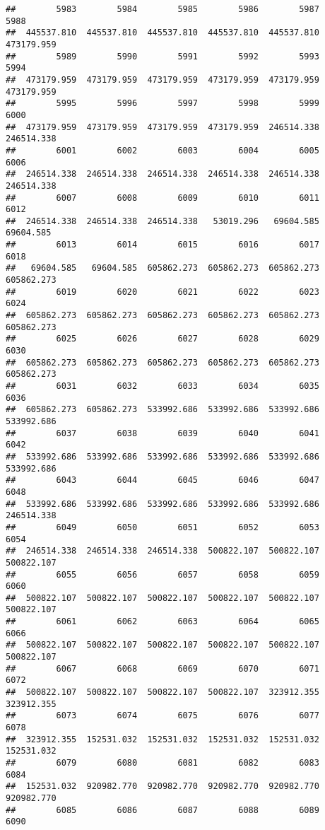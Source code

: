 \documentclass[
]{book}
\begin{document}
\begin{verbatim}
##        5983        5984        5985        5986        5987        5988 
##  445537.810  445537.810  445537.810  445537.810  445537.810  473179.959 
##        5989        5990        5991        5992        5993        5994 
##  473179.959  473179.959  473179.959  473179.959  473179.959  473179.959 
##        5995        5996        5997        5998        5999        6000 
##  473179.959  473179.959  473179.959  473179.959  246514.338  246514.338 
##        6001        6002        6003        6004        6005        6006 
##  246514.338  246514.338  246514.338  246514.338  246514.338  246514.338 
##        6007        6008        6009        6010        6011        6012 
##  246514.338  246514.338  246514.338   53019.296   69604.585   69604.585 
##        6013        6014        6015        6016        6017        6018 
##   69604.585   69604.585  605862.273  605862.273  605862.273  605862.273 
##        6019        6020        6021        6022        6023        6024 
##  605862.273  605862.273  605862.273  605862.273  605862.273  605862.273 
##        6025        6026        6027        6028        6029        6030 
##  605862.273  605862.273  605862.273  605862.273  605862.273  605862.273 
##        6031        6032        6033        6034        6035        6036 
##  605862.273  605862.273  533992.686  533992.686  533992.686  533992.686 
##        6037        6038        6039        6040        6041        6042 
##  533992.686  533992.686  533992.686  533992.686  533992.686  533992.686 
##        6043        6044        6045        6046        6047        6048 
##  533992.686  533992.686  533992.686  533992.686  533992.686  246514.338 
##        6049        6050        6051        6052        6053        6054 
##  246514.338  246514.338  246514.338  500822.107  500822.107  500822.107 
##        6055        6056        6057        6058        6059        6060 
##  500822.107  500822.107  500822.107  500822.107  500822.107  500822.107 
##        6061        6062        6063        6064        6065        6066 
##  500822.107  500822.107  500822.107  500822.107  500822.107  500822.107 
##        6067        6068        6069        6070        6071        6072 
##  500822.107  500822.107  500822.107  500822.107  323912.355  323912.355 
##        6073        6074        6075        6076        6077        6078 
##  323912.355  152531.032  152531.032  152531.032  152531.032  152531.032 
##        6079        6080        6081        6082        6083        6084 
##  152531.032  920982.770  920982.770  920982.770  920982.770  920982.770 
##        6085        6086        6087        6088        6089        6090 

\end{verbatim}
\end{document}
